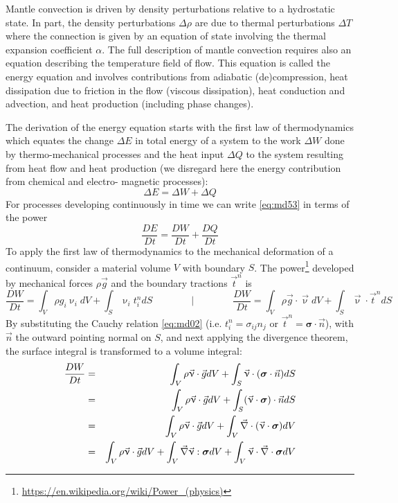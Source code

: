 Mantle convection is driven by density perturbations relative to a hydrostatic state. In
part, the density perturbations $\Delta\rho$ are due to thermal perturbations $\Delta T$ where the
connection is given by an equation of state involving the thermal expansion coefficient $\alpha$.
The full description of mantle convection requires also an equation describing the
temperature field of flow. This equation is called the energy equation and involves
contributions from adiabatic (de)compression, heat dissipation due to friction in the flow
(viscous dissipation), heat conduction and advection, and heat production (including
phase changes).

The derivation of the energy equation starts with the first law of thermodynamics which
equates the change $\Delta E$ in total energy of a system to the work $\Delta W$ done by 
thermo-mechanical processes and the heat input $\Delta Q$ to the system resulting from heat flow and
heat production (we disregard here the energy contribution from chemical and electro-
magnetic processes):
\begin{equation}
\Delta E = \Delta W + \Delta Q
\label{eq:md53}
\end{equation}
For processes developing continuously in time we can write \eqref{eq:md53} in terms of the power
\begin{equation}
\frac{D E}{Dt} = \frac{D W}{Dt} + \frac{D Q}{Dt}
\label{eq:md54}
\end{equation}
To apply the first law of thermodynamics to the mechanical deformation of a continuum,
consider a material volume $V$ with boundary $S$. The power\footnote{
\url{https://en.wikipedia.org/wiki/Power_(physics)}} developed by mechanical
forces $\rho \vec{g}$ and the boundary tractions $\vec{t}^n$ is
\begin{equation}
\frac{DW}{Dt} = \int_V \rho g_i \upnu_i dV + \int_S \upnu_i t_i^n  dS
\qquad
\qquad
\bigg\rvert
\qquad
\qquad
\frac{DW}{Dt} = \int_V \rho \vec{g}\cdot \vec\upnu dV 
+ \int_S \vec\upnu\cdot \vec{t}^n  dS
\label{eq:md55}
\end{equation}
By substituting the Cauchy relation \eqref{eq:md02}
(i.e. $t_i^n = \sigma_{ij}n_j$ or $\vec{t}^n={\bm \sigma}\cdot\vec{n}$), 
with $\vec{n}$ the outward pointing normal
on $S$, and next applying the divergence theorem, 
the surface integral is transformed to a volume integral:
\begin{eqnarray}
\frac{DW}{Dt} 
&=& \int_V \rho \vec{\upnu}\cdot \vec{g} dV + \int_S \vec\upnu\cdot  ({\bm \sigma} \cdot \vec{n}) dS \nonumber\\
&=& \int_V \rho \vec{\upnu}\cdot \vec{g} dV + \int_S (\vec\upnu\cdot  {\bm \sigma}) \cdot \vec{n} dS \nonumber\\
&=& \int_V \rho \vec{\upnu}\cdot \vec{g} dV + \int_V \vec\nabla \cdot ( \vec\upnu \cdot  {\bm \sigma} ) dV \nonumber\\
&=& \int_V \rho \vec{\upnu}\cdot \vec{g} dV 
+ \int_V \vec\nabla \vec\upnu :   {\bm \sigma}  dV 
+ \int_V \vec\upnu \cdot \vec\nabla\cdot  {\bm \sigma}  dV \nonumber
\end{eqnarray}
